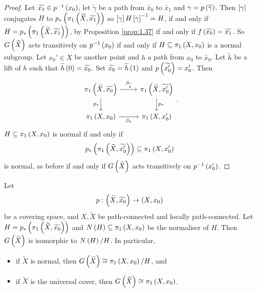 \pagebreak

\begin{proof}
Let $ \widetilde{x_1} \in p^{-1}\rb{x_0} $, let $ \widetilde{\gamma} $ be a path from $ \widetilde{x_0} $ to $ \widetilde{x_1} $ and $ \gamma = p\rb{\widetilde{\gamma}} $. Then $ \sb{\gamma} $ conjugates $ H $ to $ p_*\rb{\pi_1\rb{\widetilde{X}, \widetilde{x_1}}} $ so $ \sb{\gamma}H\sb{\gamma}^{-1} = H $, if and only if $ H = p_*\rb{\pi_1\rb{\widetilde{X}, \widetilde{x_1}}} $, by Proposition \ref{prop:1.37} if and only if $ f\rb{\widetilde{x_0}} = \widetilde{x_1} $. So $ G\rb{\widetilde{X}} $ acts transitively on $ p^{-1}\rb{x_0} $ if and only if $ H \subseteq \pi_1\rb{X, x_0} $ is a normal subgroup. Let $ x_0' \in X $ be another point and $ h $ a path from $ x_0 $ to $ \widetilde{x_0} $. Let $ \widetilde{h} $ be a lift of $ h $ such that $ \widetilde{h}\rb{0} = \widetilde{x_0} $. Set $ \widetilde{x_0} = \widetilde{h}\rb{1} $ and $ p\rb{\widetilde{x_0'}} = x_0' $. Then
$$
\begin{tikzcd}
\pi_1\rb{\widetilde{X}, \widetilde{x_0}} \arrow{r}{\beta_{\widetilde{h}}} \arrow[swap]{d}{p_*} & \pi_1\rb{\widetilde{X}, \widetilde{x_0'}} \arrow{d}{p_*} \\
\pi_1\rb{X, x_0} \arrow[swap]{r}{\beta_h} & \pi_1\rb{X, x_0'}
\end{tikzcd}.
$$
$ H \subseteq \pi_1\rb{X, x_0} $ is normal if and only if
$$ p_*\rb{\pi_1\rb{\widetilde{X}, \widetilde{x_0'}}} \subseteq \pi_1\rb{X, x_0'} $$ is normal, as before if and only if $ G\rb{\widetilde{X}} $ acts transitively on $ p^{-1}\rb{x_0'} $.
\end{proof}


\begin{proposition}
Let
$$ p : \rb{\widetilde{X}, \widetilde{x_0}} \to \rb{X, x_0} $$
be a covering space, and $ X, \widetilde{X} $ be path-connected and locally path-connected. Let $ H = p_*\rb{\pi_1\rb{\widetilde{X}, \widetilde{x_0}}} $ and $ N\rb{H} \subseteq \pi_1\rb{X, x_0} $ be the normaliser of $ H $. Then $ G\rb{\widetilde{X}} $ is isomorphic to $ N\rb{H} / H $. In particular,
\begin{itemize}
\item if $ \widetilde{X} $ is normal, then $ G\rb{\widetilde{X}} \cong \pi_1\rb{X, x_0} / H $, and
\item if $ \widetilde{X} $ is the universal cover, then $ G\rb{\widetilde{X}} \cong \pi_1\rb{X, x_0} $.
\end{itemize}
\end{proposition}

